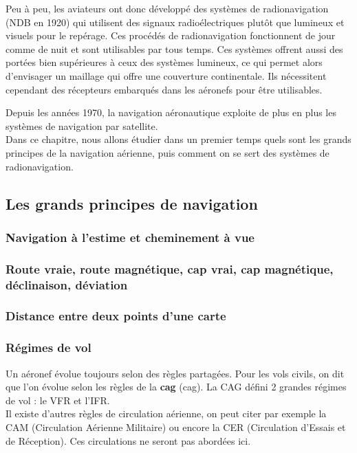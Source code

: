 	Peu à peu, les aviateurs ont donc développé des systèmes de radionavigation (NDB en 1920) qui utilisent des signaux radioélectriques plutôt que lumineux et visuels pour le repérage. Ces procédés de radionavigation fonctionnent de jour comme de nuit et sont utilisables par tous temps. Ces systèmes offrent aussi des portées bien supérieures à ceux des systèmes lumineux, ce qui permet alors d'envisager un maillage qui offre une couverture continentale. Ils nécessitent cependant des récepteurs embarqués dans les aéronefs pour être utilisables.
	
	Depuis les années 1970, la navigation aéronautique exploite de plus en plus les systèmes de navigation par satellite.\\
	
	Dans ce chapitre, nous allons étudier dans un premier temps quels sont les grands principes de la navigation aérienne, puis comment on se sert des systèmes de radionavigation.
	
	\subsection{Les grands principes de navigation}
		\subsubsection{Navigation à l'estime et cheminement à vue}
		\subsubsection{Route vraie, route magnétique, cap vrai, cap magnétique, déclinaison, déviation}
		\subsubsection{Distance entre deux points d'une carte}
		\subsubsection{Régimes de vol}
		Un aéronef évolue toujours selon des règles partagées. Pour les vols civils, on dit que l'on évolue selon les règles de la \textbf{\acrlong{cag}}	(\acrshort{cag}). La CAG défini 2 grandes régimes de vol : le VFR et l'IFR.\\
		
		Il existe d'autres règles de circulation aérienne, on peut citer par exemple la CAM (Circulation Aérienne Militaire) ou encore la CER (Circulation d'Essais et de Réception). Ces circulations ne seront pas abordées ici.
		
